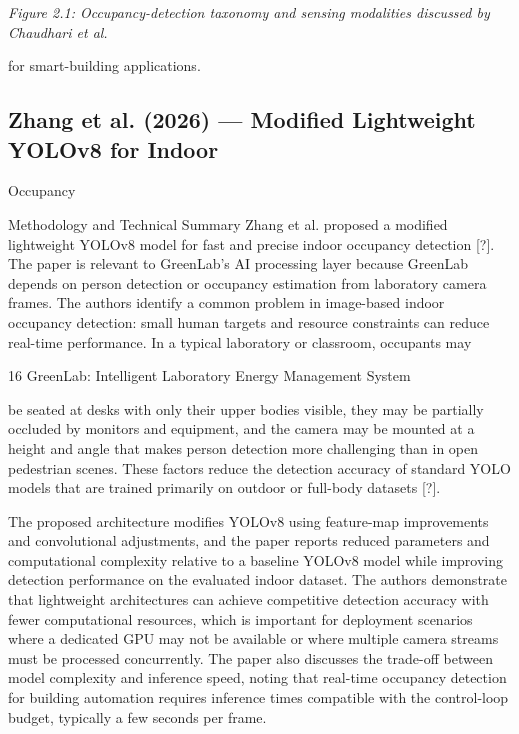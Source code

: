\textit{Figure 2.1: Occupancy-detection taxonomy and sensing modalities discussed by Chaudhari et al.}

for smart-building applications.




\subsection{Zhang et al. (2026) --- Modiﬁed Lightweight YOLOv8 for Indoor}

Occupancy

Methodology and Technical Summary Zhang et al. proposed a modiﬁed lightweight
YOLOv8 model for fast and precise indoor occupancy detection [?]. The paper is relevant
to GreenLab's AI processing layer because GreenLab depends on person detection or occupancy estimation from laboratory camera frames. The authors identify a common problem
in image-based indoor occupancy detection: small human targets and resource constraints
can reduce real-time performance. In a typical laboratory or classroom, occupants may

16
GreenLab: Intelligent Laboratory Energy Management System


be seated at desks with only their upper bodies visible, they may be partially occluded by
monitors and equipment, and the camera may be mounted at a height and angle that makes
person detection more challenging than in open pedestrian scenes. These factors reduce
the detection accuracy of standard YOLO models that are trained primarily on outdoor or
full-body datasets [?].

The proposed architecture modiﬁes YOLOv8 using feature-map improvements and
convolutional adjustments, and the paper reports reduced parameters and computational
complexity relative to a baseline YOLOv8 model while improving detection performance
on the evaluated indoor dataset. The authors demonstrate that lightweight architectures
can achieve competitive detection accuracy with fewer computational resources, which is
important for deployment scenarios where a dedicated GPU may not be available or where
multiple camera streams must be processed concurrently. The paper also discusses the
trade-off between model complexity and inference speed, noting that real-time occupancy
detection for building automation requires inference times compatible with the control-loop
budget, typically a few seconds per frame.

